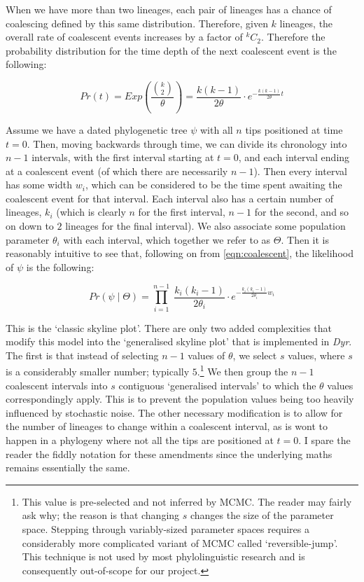\documentclass[10pt,journal,compsoc]{IEEEtran}
\begin{document}
When we have more than two lineages, each pair of lineages has a chance of coalescing defined by this same distribution. Therefore, given $k$ lineages, the overall rate of coalescent events increases by a factor of $^{k}C_2$. Therefore the probability distribution for the time depth of the next coalescent event is the following:

\begin{equation}\label{eqn:coalescent}
Pr(t) = Exp\left(\frac{\binom{k}{2}}{\theta}\right) = \frac{k(k-1)}{2\theta} \cdot e^{-\frac{k(k-1)}{2\theta} t}
\end{equation}

Assume we have a dated phylogenetic tree $\psi$ with all $n$ tips positioned at time $t=0$. Then, moving backwards through time, we can divide its chronology into $n - 1$ intervals, with the first interval starting at $t=0$, and each interval ending at a coalescent event (of which there are necessarily $n-1$). Then every interval has some width $w_i$, which can be considered to be the time spent awaiting the coalescent event for that interval. Each interval also has a certain number of lineages, $k_i$ (which is clearly $n$ for the first interval, $n - 1$ for the second, and so on down to $2$ lineages for the final interval). We also associate some population parameter $\theta_i$ with each interval, which together we refer to as $\Theta$. Then it is reasonably intuitive to see that, following on from \eqref{eqn:coalescent}, the likelihood of $\psi$ is the following:

\begin{equation}\label{eqn:skyline}
Pr(\psi\;|\;\Theta) = \prod_{i = 1}^{n - 1}\; \frac{k_i(k_i-1)}{2\theta_i} \cdot e^{-\frac{k_i(k_i-1)}{2\theta_i} w_i}
\end{equation}

This is the `classic skyline plot'. There are only two added complexities that modify this model into the `generalised skyline plot' that is implemented in \textit{Dyr}. The first is that instead of selecting $n - 1$ values of $\theta$, we select $s$ values, where $s$ is a considerably smaller number; typically $5$.\footnote{This value is pre-selected and not inferred by MCMC. The reader may fairly ask why; the reason is that changing $s$ changes the size of the parameter space. Stepping through variably-sized parameter spaces requires a considerably more complicated variant of MCMC called `reversible-jump'. This technique is not used by most phylolinguistic research and is consequently out-of-scope for our project.} We then group the $n - 1$ coalescent intervals into $s$ contiguous `generalised intervals' to which the $\theta$ values correspondingly apply. This is to prevent the population values being too heavily influenced by stochastic noise. The other necessary modification is to allow for the number of lineages to change within a coalescent interval, as is wont to happen in a phylogeny where not all the tips are positioned at $t = 0$. I spare the reader the fiddly notation for these amendments since the underlying maths remains essentially the same.
\end{document}
